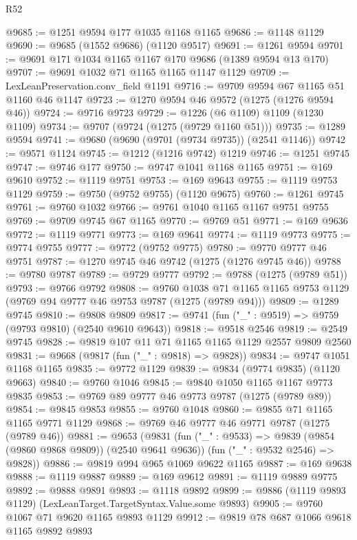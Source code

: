 \begin{lexlean}{R52}
\begin{coremodule}
@9685 := @1251 @9594 @177 @1035 @1168 @1165
@9686 := @1148 @1129
@9690 := @9685 (@1552 @9686) (@1120 @9517)
@9691 := @1261 @9594
@9701 := @9691 @171 @1034 @1165 @1167 @170 @9686 (@1389 @9594 @13 @170)
@9707 := @9691 @1032 @71 @1165 @1165 @1147 @1129
@9709 := LexLeanPreservation.conv_field @1191
@9716 := @9709 @9594 @67 @1165 @51 @1160 @46 @1147
@9723 := @1270 @9594 @46 @9572 (@1275 (@1276 @9594 @46))
@9724 := @9716 @9723
@9729 := @1226 (@6 @1109) @1109 (@1230 @1109)
@9734 := @9707 (@9724 (@1275 (@9729 @1160 @51)))
@9735 := @1289 @9594
@9741 := @9680 (@9690 (@9701 (@9734 @9735)) (@2541 @1146))
@9742 := @9571 @1124
@9745 := @1212 (@1216 @9742) @1219
@9746 := @1251 @9745
@9747 := @9746 @177
@9750 := @9747 @1041 @1168 @1165
@9751 := @169 @9610
@9752 := @1119 @9751
@9753 := @169 @9643
@9755 := @1119 @9753 @1129
@9759 := @9750 (@9752 @9755) (@1120 @9675)
@9760 := @1261 @9745
@9761 := @9760 @1032
@9766 := @9761 @1040 @1165 @1167 @9751 @9755
@9769 := @9709 @9745 @67 @1165
@9770 := @9769 @51
@9771 := @169 @9636
@9772 := @1119 @9771
@9773 := @169 @9641
@9774 := @1119 @9773
@9775 := @9774 @9755
@9777 := @9772 (@9752 @9775)
@9780 := @9770 @9777 @46 @9751
@9787 := @1270 @9745 @46 @9742 (@1275 (@1276 @9745 @46))
@9788 := @9780 @9787
@9789 := @9729 @9777
@9792 := @9788 (@1275 (@9789 @51))
@9793 := @9766 @9792
@9808 := @9760
    @1038
    @71
    @1165
    @1165
    @9753
    @1129
    (@9769 @94 @9777 @46 @9753 @9787 (@1275 (@9789 @94)))
@9809 := @1289 @9745
@9810 := @9808 @9809
@9817 := @9741 (fun ("_" : @9519) => @9759 (@9793 @9810) (@2540 @9610 @9643))
@9818 := @9518 @2546
@9819 := @2549 @9745
@9828 := @9819 @107 @11 @71 @1165 @1165 @1129 @2557 @9809 @2560
@9831 := @9668 (@9817 (fun ("_" : @9818) => @9828))
@9834 := @9747 @1051 @1168 @1165
@9835 := @9772 @1129
@9839 := @9834 (@9774 @9835) (@1120 @9663)
@9840 := @9760 @1046
@9845 := @9840 @1050 @1165 @1167 @9773 @9835
@9853 := @9769 @89 @9777 @46 @9773 @9787 (@1275 (@9789 @89))
@9854 := @9845 @9853
@9855 := @9760 @1048
@9860 := @9855 @71 @1165 @1165 @9771 @1129
@9868 := @9769 @46 @9777 @46 @9771 @9787 (@1275 (@9789 @46))
@9881 := @9653
    (@9831
      (fun ("_" : @9533) => @9839 (@9854 (@9860 @9868 @9809)) (@2540 @9641 @9636))
      (fun ("_" : @9532 @2546) => @9828))
@9886 := @9819 @994 @965 @1069 @9622 @1165
@9887 := @169 @9638
@9888 := @1119 @9887
@9889 := @169 @9612
@9891 := @1119 @9889 @9775
@9892 := @9888 @9891
@9893 := @1118 @9892
@9899 := @9886 (@1119 @9893 @1129) (LexLeanTarget.TargetSyntax.Value.some @9893)
@9905 := @9760 @1067 @71 @9620 @1165 @9893 @1129
@9912 := @9819 @78 @687 @1066 @9618 @1165 @9892 @9893

\end{coremodule}
\end{lexlean}

